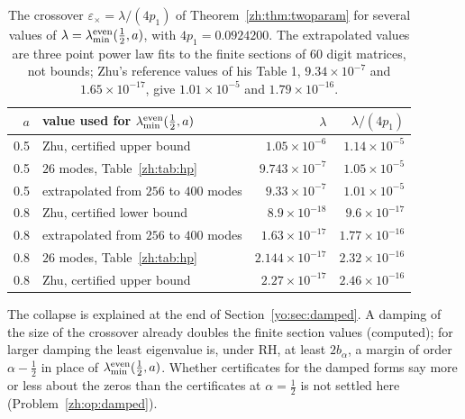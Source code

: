 \begin{table}[htbp]
\centering\small
\begin{tabular}{rlrr}
\toprule
$a$ & value used for $\lambda_{\min}^{\rm even}(\frac12,a)$ & $\lambda$ & $\lambda/(4p_1)$\\
\midrule
0.5 & Zhu, certified upper bound & $1.05\times10^{-6}$ & $1.14\times10^{-5}$\\
0.5 & $26$ modes, Table~\ref{zh:tab:hp} & $9.743\times10^{-7}$ & $1.05\times10^{-5}$\\
0.5 & extrapolated from $256$ to $400$ modes & $9.33\times10^{-7}$ & $1.01\times10^{-5}$\\
0.8 & Zhu, certified lower bound & $8.9\times10^{-18}$ & $9.6\times10^{-17}$\\
0.8 & extrapolated from $256$ to $400$ modes & $1.63\times10^{-17}$ & $1.77\times10^{-16}$\\
0.8 & $26$ modes, Table~\ref{zh:tab:hp} & $2.144\times10^{-17}$ & $2.32\times10^{-16}$\\
0.8 & Zhu, certified upper bound & $2.27\times10^{-17}$ & $2.46\times10^{-16}$\\
\bottomrule
\end{tabular}
\caption{The crossover $\varepsilon_\times=\lambda/(4p_1)$ of Theorem~\ref{zh:thm:twoparam} for several values of $\lambda=\lambda_{\min}^{\rm even}(\frac12,a)$, with $4p_1=0.0924200$. The extrapolated values are three point power law fits to the finite sections of $60$ digit matrices, not bounds; Zhu's reference values of his Table 1, $9.34\times10^{-7}$ and $1.65\times10^{-17}$, give $1.01\times10^{-5}$ and $1.79\times10^{-16}$.}
\label{zh:tab:cross}
\end{table}

The collapse is explained at the end of Section~\ref{yo:sec:damped}. A damping of the size of the crossover already doubles the finite section values (computed); for larger damping the least eigenvalue is, under RH, at least $2b_\alpha$, a margin of order $\alpha-\frac12$ in place of $\lambda_{\min}^{\rm even}(\frac12,a)$. Whether certificates for the damped forms say more or less about the zeros than the certificates at $\alpha=\frac12$ is not settled here (Problem~\ref{zh:op:damped}).
